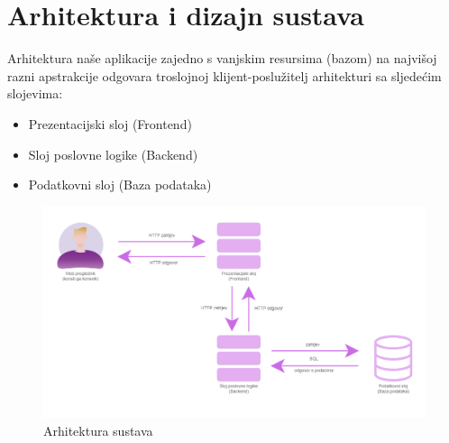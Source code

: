 \chapter{Arhitektura i dizajn sustava}
		

				
		Arhitektura naše aplikacije zajedno s vanjskim resursima (bazom) na najvišoj razni apstrakcije odgovara troslojnoj klijent-poslužitelj arhitekturi sa sljedećim slojevima:
		\begin{itemize}
			\item Prezentacijski sloj (Frontend)
			\item Sloj poslovne logike (Backend)
			\item Podatkovni sloj (Baza podataka)
		\end{itemize}

		\begin{figure}[H]
			\includegraphics[width=\textwidth,height=0.4\textheight]{slike/Arhitektura.png}
			\centering
			\caption{Arhitektura sustava}
			\label{fig:Arhitektura}
		\end{figure}

